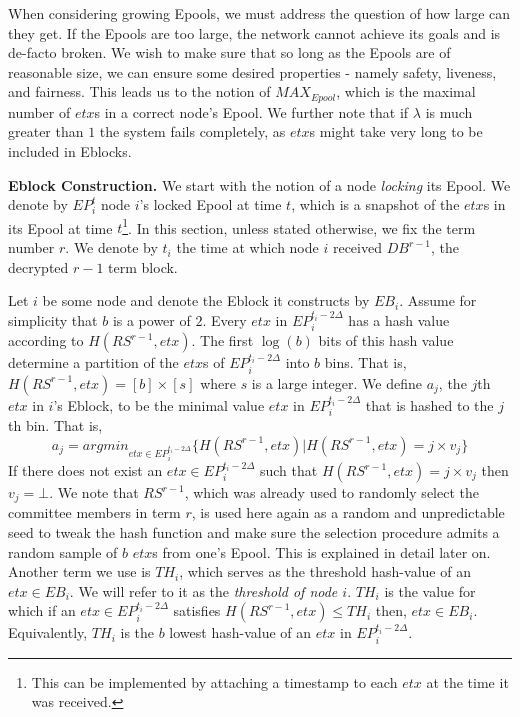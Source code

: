 When considering growing Epools, we must address the question of how large can they get. If the Epools are too large, the network cannot achieve its goals and is de-facto broken. We wish to make sure that so long as the Epools are of reasonable size, we can ensure some desired properties - namely safety, liveness, and fairness. This leads us to the notion of $MAX_{Epool}$, which is the maximal number of $etx$s in a correct node's Epool. We further note that if $\lambda$ is much greater than $1$ the system fails completely, as $etx$s might take very long to be included in Eblocks.


\textbf{Eblock Construction.} We start with the notion of a node \emph{locking} its Epool. We denote by $EP_i^t$ node $i$'s locked Epool at time $t$, which is a snapshot of the $etx$s in its Epool at time $t$\footnote{This can be implemented by attaching a timestamp to each $etx$ at the time it was received.}. In this section, unless stated otherwise, we fix the term number $r$. We denote by $t_i$ the time at which node $i$ received $DB^{r-1}$, the decrypted $r-1$ term block. 

Let $i$ be some node and denote the Eblock it constructs by $EB_i$. Assume for simplicity that $b$ is a power of $2$. Every $etx$ in $EP_i^{t_i-2\Delta}$ has a hash value according to $H(RS^{r-1},etx)$. The first $\log (b)$ bits of this hash value determine a partition of the $etx$s of $EP_i^{t_i-2\Delta}$ into $b$ bins. That is, $H(RS^{r-1},etx)=[b]\times [s]$ where $s$ is a large integer. We define $a_j$, the $j$th $etx$ in $i$'s Eblock, to be the minimal value $etx$ in $EP_i^{t_i-2\Delta}$ that is hashed to the $j$th bin. That is, 
\begin{equation}\label{def:a_j}
a_j=argmin _{etx\in EP_i^{t_i-2\Delta}}\{H(RS^{r-1},etx)|H(RS^{r-1},etx)=j\times v_j\}
\end{equation}
If there does not exist an $etx\in EP_i^{t_i-2\Delta}$ such that $H(RS^{r-1},etx)=j\times v_j$ then $v_j=\bot$. We note that $RS^{r-1}$, which was already used to randomly select the committee members in term $r$, is used here again as a random and unpredictable seed to tweak the hash function and make sure the selection procedure admits a random sample of $b$ $etx$s from one's Epool. This is explained in detail later on. Another term we use is $TH_i$, which serves as the threshold hash-value of an $etx\in EB_i$. We will refer to it as the \textit{threshold of node $i$}. $TH_i$ is the value for which if an $etx\in EP_i^{t_i-2\Delta}$ satisfies $H(RS^{r-1},etx)\leq TH_i$ then, $etx\in EB_i$. Equivalently, $TH_i$ is the $b$ lowest hash-value of an $etx$ in $EP_i^{t_i-2\Delta}$. 

